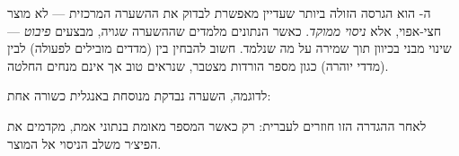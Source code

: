 ה- הוא הגרסה הזולה ביותר שעדיין מאפשרת לבדוק את ההשערה המרכזית — לא
מוצר חצי-אפוי, אלא \emph{ניסוי ממוקד}. כאשר הנתונים מלמדים שההשערה שגויה, מבצעים
\emph{פיבוט}  — שינוי מבני בכיוון תוך שמירה על מה שנלמד. חשוב להבחין
בין  (מדדים מובילים לפעולה) לבין 
(מדדי יוהרה) כגון מספר הורדות מצטבר, שנראים טוב אך אינם מנחים החלטה.

לדוגמה, השערה נבדקת מנוסחת באנגלית כשורה אחת:
\begin{quote}\end{quote}
לאחר ההגדרה הזו חוזרים לעברית: רק כאשר המספר מאומת בנתוני אמת, מקדמים את הפיצ׳ר
משלב הניסוי אל המוצר.
